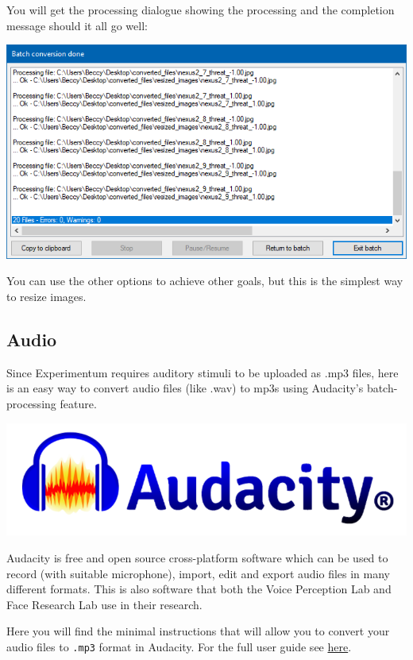 \documentclass[]{book}
\begin{document}
You will get the processing dialogue showing the processing and the
completion message should it all go well:

\includegraphics{images/screenshots/irfanview_10a.png}

You can use the other options to achieve other goals, but this is the
simplest way to resize images.

\subsection{Audio}\label{audio}

Since Experimentum requires auditory stimuli to be uploaded as .mp3
files, here is an easy way to convert audio files (like .wav) to mp3s
using Audacity's batch-processing feature.

\includegraphics{images/screenshots/audacity_logo.png}

Audacity is free and open source cross-platform software which can be
used to record (with suitable microphone), import, edit and export audio
files in many different formats. This is also software that both the
Voice Perception Lab and Face Research Lab use in their research.

Here you will find the minimal instructions that will allow you to
convert your audio files to \texttt{.mp3} format in Audacity. For the
full user guide see
\href{https://manual.audacityteam.org/index.html}{here}.
\end{document}

